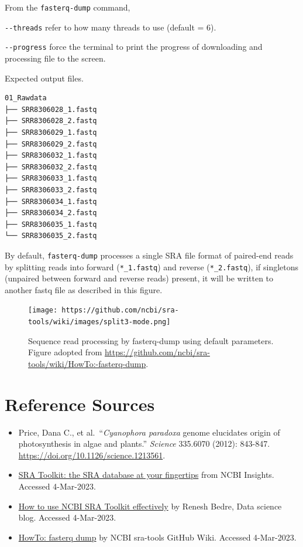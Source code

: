 \documentclass[
  letterpaper,
  DIV=11,
  numbers=noendperiod]{scrreprt}
\providecommand{\tightlist}{%
  \setlength{\itemsep}{0pt}\setlength{\parskip}{0pt}}\usepackage{longtable,booktabs,array}
\begin{document}
\begin{tcolorbox}
From the \texttt{fasterq-dump} command,

\texttt{-\/-threads} refer to how many threads to use (default = 6).

\texttt{-\/-progress} force the terminal to print the progress of
downloading and processing file to the screen.

Expected output files.

\begin{verbatim}
01_Rawdata
├── SRR8306028_1.fastq
├── SRR8306028_2.fastq
├── SRR8306029_1.fastq
├── SRR8306029_2.fastq
├── SRR8306032_1.fastq
├── SRR8306032_2.fastq
├── SRR8306033_1.fastq
├── SRR8306033_2.fastq
├── SRR8306034_1.fastq
├── SRR8306034_2.fastq
├── SRR8306035_1.fastq
└── SRR8306035_2.fastq
\end{verbatim}

\end{tcolorbox}

By default, \texttt{fasterq-dump} processes a single SRA file format of
paired-end reads by splitting reads into forward (\texttt{*\_1.fastq})
and reverse (\texttt{*\_2.fastq}), if singletons (unpaired between
forward and reverse reads) present, it will be written to another fastq
file as described in this figure.

\begin{figure}

{\centering \texttt{[image: https://github.com/ncbi/sra-tools/wiki/images/split3-mode.png]}

}

\caption{Sequence read processing by fasterq-dump using default
parameters. Figure adopted from
\url{https://github.com/ncbi/sra-tools/wiki/HowTo:-fasterq-dump}.}

\end{figure}

\hypertarget{reference-sources}{%
\section{Reference Sources}\label{reference-sources}}

\begin{itemize}
\tightlist
\item
  Price, Dana C., et al.~``\emph{Cyanophora paradoxa} genome elucidates
  origin of photosynthesis in algae and plants.'' \emph{Science}
  335.6070 (2012): 843-847.
  \url{https://doi.org/10.1126/science.1213561}.
\item
  \href{https://ncbiinsights.ncbi.nlm.nih.gov/2015/12/11/sra-toolkit-the-sra-database-at-your-fingertips/}{SRA
  Toolkit: the SRA database at your fingertips} from NCBI Insights.
  Accessed 4-Mar-2023.
\item
  \href{https://www.reneshbedre.com/blog/ncbi_sra_toolkit.html}{How to
  use NCBI SRA Toolkit effectively} by Renesh Bedre, Data science blog.
  Accessed 4-Mar-2023.
\item
  \href{https://github.com/ncbi/sra-tools/wiki/HowTo:-fasterq-dump}{HowTo:
  fasterq dump} by NCBI sra-tools GitHub Wiki. Accessed 4-Mar-2023.
\end{itemize}
\end{document}
